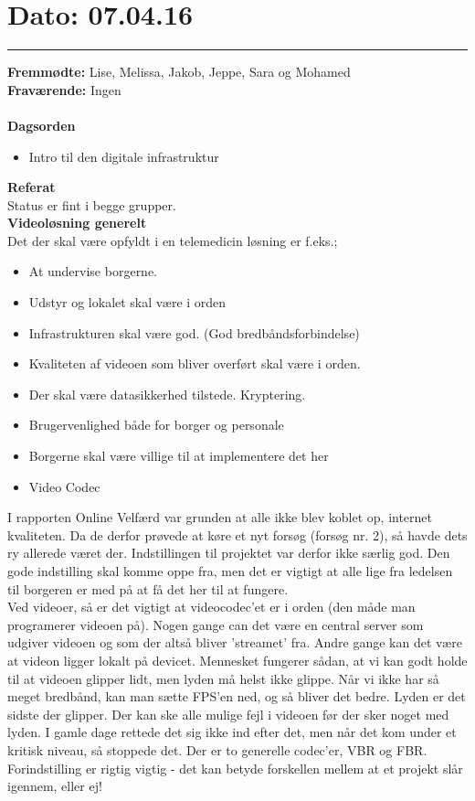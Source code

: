 

\section{Dato: 07.04.16}
\hrule
\textbf{Fremmødte:} Lise, Melissa, Jakob, Jeppe, Sara og Mohamed \\

\textbf{Fraværende:} Ingen
\\
\\
\textbf{Dagsorden}
\begin{itemize}
\item Intro til den digitale infrastruktur
\end{itemize}

\textbf{Referat} 
\\
Status er fint i begge grupper.\\
\textbf{Videoløsning generelt}\\
Det der skal være opfyldt i en telemedicin løsning er f.eks.; 
\begin{itemize}
	\item At undervise borgerne.
	\item Udstyr og lokalet skal være i orden
	\item Infrastrukturen skal være god. (God bredbåndsforbindelse)
	\item Kvaliteten af videoen som bliver overført skal være i orden.
	\item Der skal være datasikkerhed tilstede. Kryptering.
	\item Brugervenlighed både for borger og personale
	\item Borgerne skal være villige til at implementere det her
	\item Video Codec
\end{itemize}
I rapporten Online Velfærd var grunden at alle ikke blev koblet op, internet kvaliteten. Da de derfor prøvede at køre et nyt forsøg (forsøg nr. 2), så havde dets ry allerede været der. Indstillingen til projektet var derfor ikke særlig god. Den gode indstilling skal komme oppe fra, men det er vigtigt at alle lige fra ledelsen til borgeren er med på at få det her til at fungere.\\
Ved videoer, så er det vigtigt at videocodec'et er i orden (den måde man programerer videoen på). Nogen gange can det være en central server som udgiver videoen og som der altså bliver 'streamet' fra. Andre gange kan det være at videon ligger lokalt på devicet. Mennesket fungerer sådan, at vi kan godt holde til at videoen glipper lidt, men lyden må helst ikke glippe. Når vi ikke har så meget bredbånd, kan man sætte FPS'en ned, og så bliver det bedre. Lyden er det sidste der glipper. Der kan ske alle mulige fejl i videoen før der sker noget med lyden. I gamle dage rettede det sig ikke ind efter det, men når det kom under et kritisk niveau, så stoppede det. Der er to generelle codec'er, VBR og FBR. \\
Forindstilling er rigtig vigtig - det kan betyde forskellen mellem at et projekt slår igennem, eller ej! \\

